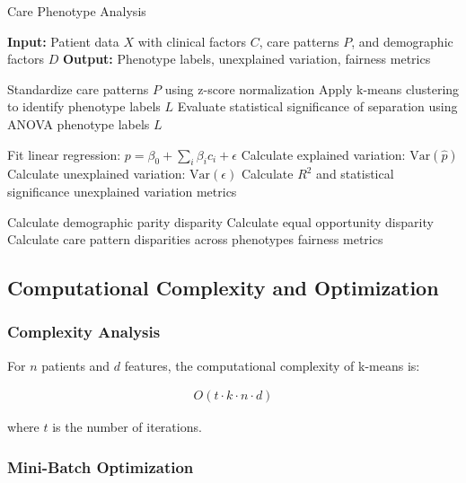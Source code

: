 \documentclass[12pt]{article}
\begin{document}
\begin{algorithm}[H]
\caption{Care Phenotype Analysis}
\begin{algorithmic}[1]
\State \textbf{Input:} Patient data $X$ with clinical factors $C$, care patterns $P$, and demographic factors $D$
\State \textbf{Output:} Phenotype labels, unexplained variation, fairness metrics

    \State Standardize care patterns $P$ using z-score normalization
    \State Apply k-means clustering to identify phenotype labels $L$
    \State Evaluate statistical significance of separation using ANOVA
    \State \Return phenotype labels $L$
\EndProcedure

        \State Fit linear regression: $p = \beta_0 + \sum_{i} \beta_i c_i + \epsilon$
        \State Calculate explained variation: $\text{Var}(\hat{p})$
        \State Calculate unexplained variation: $\text{Var}(\epsilon)$
        \State Calculate $R^2$ and statistical significance
    \EndFor
    \State \Return unexplained variation metrics
\EndProcedure

        \State Calculate demographic parity disparity
        \State Calculate equal opportunity disparity
    \EndFor
    \State Calculate care pattern disparities across phenotypes
    \State \Return fairness metrics
\EndProcedure
\end{algorithmic}
\end{algorithm}

\subsection{Computational Complexity and Optimization}

\subsubsection{Complexity Analysis}

For $n$ patients and $d$ features, the computational complexity of k-means is:

\begin{align}
O(t \cdot k \cdot n \cdot d)
\end{align}

where $t$ is the number of iterations.

\subsubsection{Mini-Batch Optimization}
\end{document}
